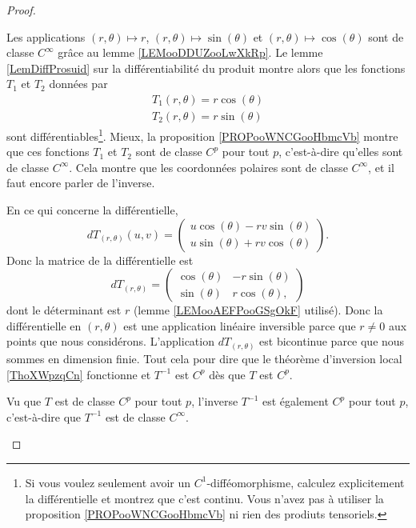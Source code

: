 \begin{proof}
\begin{enumerate}
                Les applications \( (r,\theta)\mapsto r\), \( (r,\theta)\mapsto \sin(\theta)\) et \( (r,\theta)\mapsto \cos(\theta)\) sont de classe \(  C^{\infty}\) grâce au lemme \ref{LEMooDDUZooLwXkRp}. Le lemme \ref{LemDiffProsuid} sur la différentiabilité du produit montre alors que les fonctions \( T_1\) et \( T_2\) données par
                \begin{subequations}
                    \begin{align}
                        T_1(r,\theta)=r\cos(\theta)\\
                        T_2(r,\theta)=r\sin(\theta)
                    \end{align}
                \end{subequations}
                sont différentiables\footnote{Si vous voulez seulement avoir un \( C^1\)-difféomorphisme, calculez explicitement la différentielle et montrez que c'est continu. Vous n'avez pas à utiliser la proposition \ref{PROPooWNCGooHbmcVb} ni rien des prodiuts tensoriels.}. Mieux, la proposition \ref{PROPooWNCGooHbmcVb} montre que ces fonctions \( T_1\) et \( T_2\) sont de classe \( C^p\) pour tout \( p\), c'est-à-dire qu'elles sont de classe \(  C^{\infty}\). Cela montre que les coordonnées polaires sont de classe \(  C^{\infty}\), et il faut encore parler de l'inverse.

                En ce qui concerne la différentielle,
                \begin{equation}
                    dT_{(r,\theta)}(u,v)=\begin{pmatrix}
                        u\cos(\theta)-rv\sin(\theta)    \\ 
                        u\sin(\theta)+rv\cos(\theta)    
                    \end{pmatrix}.
                \end{equation}
                Donc la matrice de la différentielle est
                \begin{equation}
                    dT_{(r,\theta)}=\begin{pmatrix}
                        \cos(\theta)    &  -r\sin(\theta)    \\ 
                        \sin(\theta)    &   r\cos(\theta),    
                    \end{pmatrix}
                \end{equation}
                dont le déterminant est \( r\) (lemme \ref{LEMooAEFPooGSgOkF} utilisé). Donc la différentielle en \( (r,\theta)\) est une application linéaire inversible parce que \( r\neq 0\) aux points que nous considérons. L'application \( dT_{(r,\theta)}\) est bicontinue parce que nous sommes en dimension finie. Tout cela pour dire que le théorème d'inversion local \ref{ThoXWpzqCn} fonctionne et \( T^{-1}\) est \( C^p\) dès que \( T\) est \( C^p\). 

                Vu que \( T\) est de classe \( C^p\) pour tout \( p\), l'inverse \( T^{-1}\) est également \( C^p\) pour tout \( p\), c'est-à-dire que \( T^{-1}\) est de classe \(  C^{\infty}\).
    \end{enumerate}
\end{proof}

